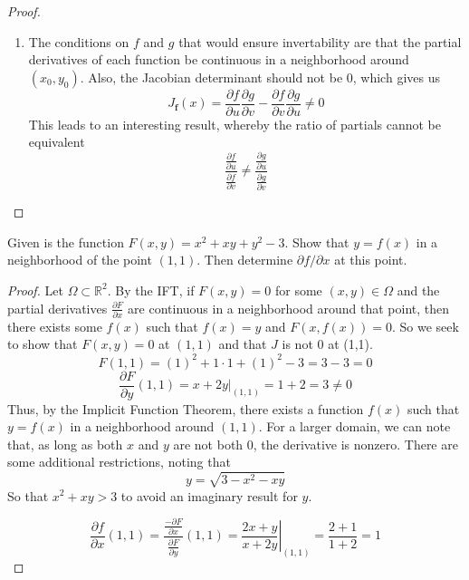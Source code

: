 \documentclass[12pt]{article}
\newcommand{\R}{\mathbb{R}}
\newcommand{\bvec}[1]{\textbf{#1}}
\newenvironment{problem}[2][Problem]{\begin{trivlist}
\item[\hskip \labelsep {\bfseries #1}\hskip \labelsep {\bfseries #2.}]}{\end{trivlist}}
\begin{document}
\begin{proof}
\begin{enumerate}
    \item The conditions on $f$ and $g$ that would ensure invertability are that the partial derivatives of each function be continuous in a neighborhood around $(x_0,y_0)$. Also, the Jacobian determinant should not be $0$, which gives us
    \[
        J_{\bvec{f}}(x)=\frac{\partial f}{\partial u}\frac{\partial g}{\partial v}-\frac{\partial f}{\partial v}\frac{\partial g}{\partial u}\not=0
    \]
    This leads to an interesting result, whereby the ratio of partials cannot be equivalent
    \[
        \frac{
            \frac{\partial f}{\partial u}
        }{
            \frac{\partial f}{\partial v}
        }\not=\frac{
            \frac{\partial g}{\partial u}
        }{
            \frac{\partial g}{\partial v}
        }
    \]
    \vspace{6in}
\end{enumerate}
\end{proof}

\begin{problem}{D1}
Given is the function $F(x,y)=x^2+xy+y^2-3.$ Show that $y=f(x)$ in a neighborhood of the point $(1,1)$. Then determine $\partial f/\partial x$ at this point.
\end{problem}

\begin{proof}
Let $\Omega\subset\R^2$. By the IFT, if $F(x,y)=0$ for some $(x,y)\in\Omega$ and the partial derivatives $\frac{\partial F}{\partial x}$ are continuous in a neighborhood around that point, then there exists some $f(x)$ such that $f(x)=y$ and $F(x,f(x))=0$. So we seek to show that $F(x,y)=0$ at $(1,1)$ and that $J$ is not $0$ at (1,1). 
    \[F(1,1)=(1)^2+1\cdot1+(1)^2-3=3-3=0\]
    \[\frac{\partial F}{\partial y}(1,1) = \left.x+2y\right|_{(1,1)}=1+2=3\not=0\]
Thus, by the Implicit Function Theorem, there exists a function $f(x)$ such that $y=f(x)$ in a neighborhood around $(1,1)$. For a larger domain, we can note that, as long as both $x$ and $y$ are not both $0$, the derivative is nonzero. There are some additional restrictions, noting that 
\[y=\sqrt{3-x^2-xy}\]
So that $x^2+xy>3$ to avoid an imaginary result for $y$.

\[\frac{\partial f}{\partial x}(1,1)=\frac{\frac{-\partial F}{\partial x}}{\frac{\partial F}{\partial y}}(1,1)=\left.\frac{2x+y}{x+2y}\right|_{(1,1)}=\frac{2+1}{1+2}=1\]
\end{proof}
\end{document}
